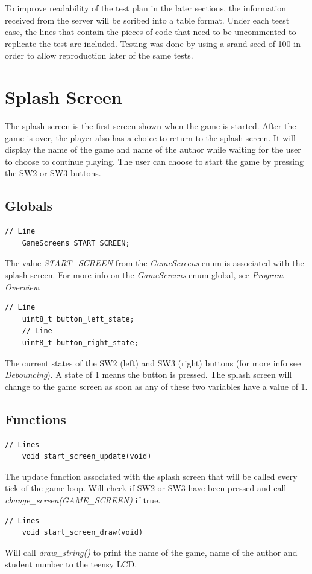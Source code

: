 \documentclass{article}
\begin{document}
To improve readability of the test plan in the later sections, the information received from the server will be scribed into a table format. Under each teest case, the lines that contain the pieces of code that need to be uncommented to replicate the test are included. 
\newline
\newline
Testing was done by using a srand seed of 100 in order to allow reproduction later of the same tests. 
\clearpage

\section{Splash Screen}
The splash screen is the first screen shown when the game is started. After the game is over, the player also has a choice to return to the splash screen. It will display the name of the game and name of the author while waiting for the user to choose to continue playing. The user can choose to start the game by pressing the SW2 or SW3 buttons.

\subsection*{Globals}
\begin{lstlisting}[style=CStyle]
	// Line 
	GameScreens START_SCREEN;
\end{lstlisting}
The value \emph{START\_SCREEN} from the \emph{GameScreens} enum is associated with the splash screen. For more info on the \emph{GameScreens} enum global, see \emph{Program Overview}. 
\begin{lstlisting}[style=CStyle]
	// Line 
	uint8_t button_left_state;
	// Line
	uint8_t button_right_state;
\end{lstlisting}
The current states of the SW2 (left) and SW3 (right) buttons (for more info see \emph{Debouncing}). A state of 1 means the button is pressed. The splash screen will change to the game screen as soon as any of these two variables have a value of 1. 
\newline

\subsection*{Functions}
\begin{lstlisting}[style=CStyle]
	// Lines 
	void start_screen_update(void)
\end{lstlisting}
The update function associated with the splash screen that will be called every tick of the game loop. Will check if SW2 or SW3 have been pressed and call \emph{change\_screen(GAME\_SCREEN)} if true.
\begin{lstlisting}[style=CStyle]
	// Lines 
	void start_screen_draw(void)
\end{lstlisting}
Will call \emph{draw\_string()} to print the name of the game, name of the author and student number to the teensy LCD.  
\newline
\end{document}
